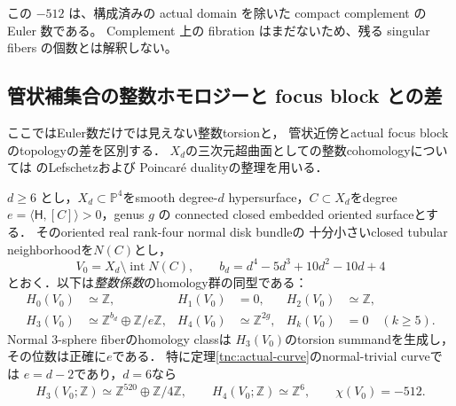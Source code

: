 この $-512$ は、構成済みの actual domain を除いた compact complement の Euler 数である。
Complement 上の fibration はまだないため、残る singular fibers の個数とは解釈しない。

\subsection{管状補集合の整数ホモロジーと focus block との差}
\label{tnc:tubular-complement}

ここではEuler数だけでは見えない整数torsionと，
管状近傍とactual focus blockのtopologyの差を区別する．
$X_d$の三次元超曲面としての整数cohomologyについては
\cite[\S2.1]{randal-williams-hypersurface}のLefschetzおよび
Poincar\'e dualityの整理を用いる．

\begin{theorem}
\label{tnc:tubular-homology}
$d\ge6$ とし，$X_d\subset\mathbb P^4$をsmooth degree-$d$
hypersurface，$C\subset X_d$をdegree
$e=\langle\mathsf H,[C]\rangle>0$，genus $g$ の
connected closed embedded oriented surfaceとする．
そのoriented real rank-four normal disk bundleの
十分小さいclosed tubular neighborhoodを$N(C)$とし，
\[
 V_0=X_d\setminus\operatorname{int}N(C),\qquad
 b_d=d^4-5d^3+10d^2-10d+4
\]
とおく．以下は\emph{整数係数}のhomology群の同型である：
\begin{equation}\label{tnc:tubular-homology-groups}
\begin{aligned}
 H_0(V_0)&\simeq\mathbb Z,&
 H_1(V_0)&=0,&
 H_2(V_0)&\simeq\mathbb Z,\\
 H_3(V_0)&\simeq\mathbb Z^{b_d}\oplus\mathbb Z/e\mathbb Z,&
 H_4(V_0)&\simeq\mathbb Z^{2g},&
 H_k(V_0)&=0\quad(k\ge5).
\end{aligned}
\end{equation}
Normal $3$-sphere fiberのhomology classは
$H_3(V_0)$のtorsion summandを生成し，その位数は正確に$e$である．
特に定理\ref{tnc:actual-curve}のnormal-trivial curveでは
$e=d-2$であり，$d=6$なら
\[
 H_3(V_0;\mathbb Z)\simeq
       \mathbb Z^{520}\oplus\mathbb Z/4\mathbb Z,\qquad
 H_4(V_0;\mathbb Z)\simeq\mathbb Z^6,\qquad
 \chi(V_0)=-512.
\]
\end{theorem}
